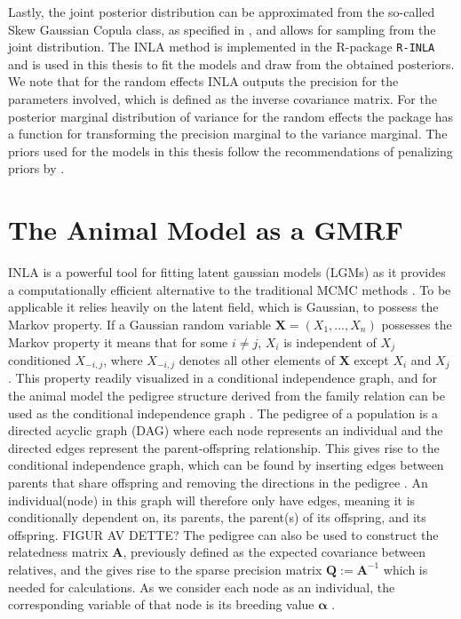 Lastly, the joint posterior distribution can be approximated from the so-called Skew Gaussian Copula class, as specified in \citet{rue2021joint}, and allows for sampling from the joint distribution. 
The INLA method is implemented in the R-package \texttt{R-INLA} \citep{gomezrubio2020inla} and is used in this thesis to fit the models and draw from the obtained posteriors. We note that for the random effects INLA outputs the precision for the parameters involved, which is defined as the inverse covariance matrix. For the posterior marginal distribution of variance for the random effects the package has a function for transforming the precision marginal to the variance marginal. The priors used for the models in this thesis follow the recommendations of penalizing priors by \citet{simpson2017penalising}.


\section{The Animal Model as a GMRF}
INLA is a powerful tool for fitting latent gaussian models (LGMs) as it provides a computationally efficient alternative to the traditional MCMC methods \citep{rue2009inla}.
To be applicable it relies heavily on the latent field, which is Gaussian, to possess the Markov property. 
If a Gaussian random variable $\mathbf{X}=(X_1, ..., X_n)$ possesses the Markov property it means that for some $i\neq j$, $X_i$ is independent of $X_j$ conditioned $X_{-i, j}$, where $X_{-i, j}$ denotes all other elements of $\mathbf{X}$ except $X_i$ and $X_j$ \citep{rue2009inla}.
This property readily visualized in a conditional independence graph, and for the animal model the pedigree structure derived from the family relation can be used as the conditional independence graph \citep[as cited in \citet{Stensland_GMRF_bayes_animal_model}]{Wermuth1983Graphical}.
The pedigree of a population is a directed acyclic graph (DAG) where each node represents an individual and the directed edges represent the parent-offspring relationship. 
This gives rise to the conditional independence graph, which can be found by inserting edges between parents that share offspring and removing the directions in the pedigree \citep{Wermuth1983Graphical}.
An individual(node) in this graph will therefore only have edges, meaning it is conditionally dependent on, its parents, the parent(s) of its offspring, and its offspring.
FIGUR AV DETTE?
The pedigree can also be used to construct the relatedness matrix $\mathbf{A}$, previously defined as the expected covariance between relatives, and the gives rise to the sparse precision matrix $\mathbf{Q}:=\mathbf{A}^{-1}$ which is needed for calculations.
As we consider each node as an individual, the corresponding variable of that node is its breeding value $\boldsymbol{\alpha}$ \citep{Stensland_GMRF_bayes_animal_model}. 

